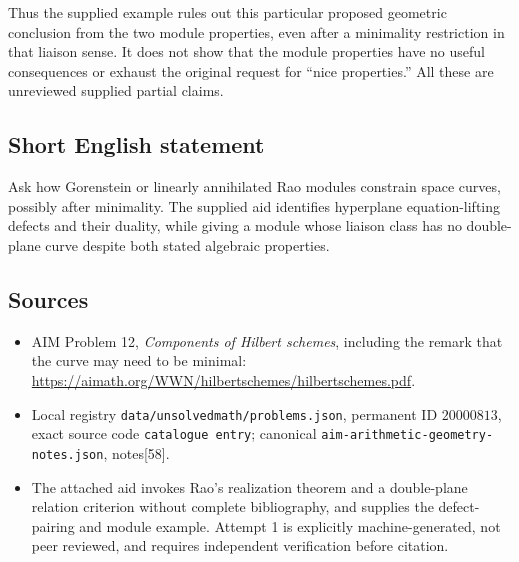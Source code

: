 \documentclass[11pt]{article}
\begin{document}
Thus the supplied example rules out this particular proposed geometric conclusion from the two module properties, even after a minimality restriction in that liaison sense. It does not show that the module properties have no useful consequences or exhaust the original request for ``nice properties.'' All these are unreviewed supplied partial claims.
\subsection{Short English statement}
Ask how Gorenstein or linearly annihilated Rao modules constrain space curves, possibly after minimality. The supplied aid identifies hyperplane equation-lifting defects and their duality, while giving a module whose liaison class has no double-plane curve despite both stated algebraic properties.
\subsection{Sources}
\begin{itemize}
\item AIM Problem 12, \emph{Components of Hilbert schemes}, including the remark that the curve may need to be minimal: \url{https://aimath.org/WWN/hilbertschemes/hilbertschemes.pdf}.
\item Local registry \texttt{data/unsolvedmath/problems.json}, permanent ID \(20000813\), exact source code \texttt{catalogue entry}; canonical \texttt{aim-arithmetic-geometry-notes.json}, notes[58].
\item The attached aid invokes Rao's realization theorem and a double-plane relation criterion without complete bibliography, and supplies the defect-pairing and module example. Attempt 1 is explicitly machine-generated, not peer reviewed, and requires independent verification before citation.
\end{itemize}
\end{document}
